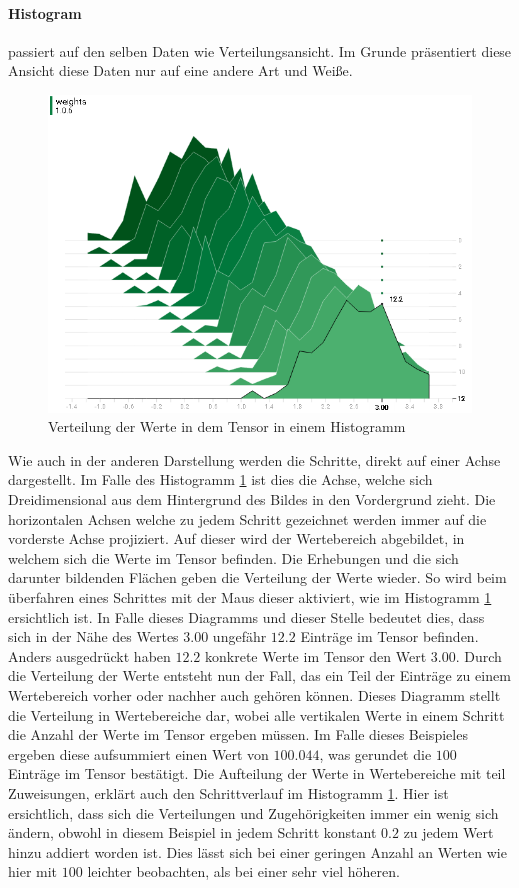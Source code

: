 \paragraph{Histogram} passiert auf den selben Daten wie Verteilungsansicht. 
Im Grunde präsentiert diese Ansicht diese Daten nur auf eine andere Art und Weiße. 
\begin{figure}
	\centering
	\includegraphics[scale=0.7]{images/histogram-value.png}
	\caption{Verteilung der Werte in dem Tensor in einem Histogramm}
	\label{fig:Histogram}
\end{figure}
Wie auch in der anderen Darstellung werden die Schritte, direkt auf einer Achse dargestellt. 
Im Falle des Histogramm \ref{fig:Histogram} ist dies die Achse, welche sich Dreidimensional aus dem Hintergrund des Bildes in den Vordergrund zieht. 
Die horizontalen Achsen welche zu jedem Schritt gezeichnet werden immer auf die vorderste Achse projiziert. 
Auf dieser wird der Wertebereich abgebildet, in welchem sich die Werte im Tensor befinden. 
Die Erhebungen und die sich darunter bildenden Flächen geben die Verteilung der Werte wieder. 
So wird beim überfahren eines Schrittes mit der Maus dieser aktiviert, wie im Histogramm \ref{fig:Histogram} ersichtlich ist. 
In Falle dieses Diagramms und dieser Stelle bedeutet dies, dass sich in der Nähe des Wertes $3.00$ ungefähr $12.2$ Einträge im Tensor befinden. 
Anders ausgedrückt haben $12.2$ konkrete Werte im Tensor den Wert $3.00$. 
Durch die Verteilung der Werte entsteht nun der Fall, das ein Teil der Einträge zu einem Wertebereich vorher oder nachher auch gehören können. 
Dieses Diagramm stellt die Verteilung in Wertebereiche dar, wobei alle vertikalen Werte in einem Schritt die Anzahl der Werte im Tensor ergeben müssen. 
Im Falle dieses Beispieles ergeben diese aufsummiert einen Wert von $100.044$, was gerundet die $100$ Einträge im Tensor bestätigt. 
Die Aufteilung der Werte in Wertebereiche mit teil Zuweisungen, erklärt auch den Schrittverlauf im Histogramm \ref{fig:Histogram}. 
Hier ist ersichtlich, dass sich die Verteilungen und Zugehörigkeiten immer ein wenig sich ändern, obwohl in diesem Beispiel in jedem Schritt konstant $0.2$ zu jedem Wert hinzu addiert worden ist. 
Dies lässt sich bei einer geringen Anzahl an Werten wie hier mit $100$ leichter beobachten, als bei einer sehr viel höheren. 
\phantom \newline

